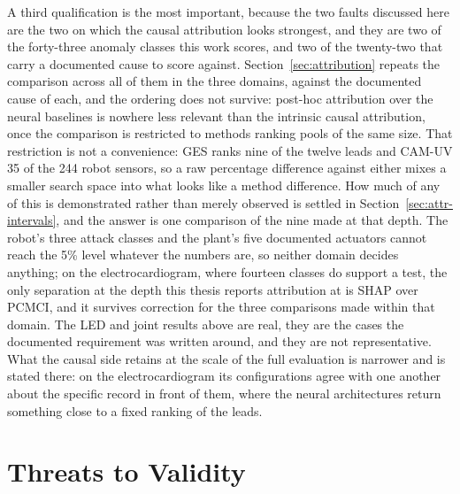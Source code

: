 A third qualification is the most important, because the two faults discussed
here are the two on which the causal attribution looks strongest, and they are
two of the forty-three anomaly classes this work scores, and two of the
twenty-two that carry a documented cause to score against. Section~\ref{sec:attribution}
repeats the comparison across all of them in the three domains, against the
documented cause of each, and the ordering does not survive: post-hoc attribution
over the neural baselines is nowhere less relevant than the intrinsic causal
attribution, once the comparison is restricted to methods ranking pools of the
same size. That restriction is not a convenience: GES ranks nine of the twelve
leads and CAM-UV 35 of the 244 robot sensors, so a raw percentage difference
against either mixes a smaller search space into what looks like a method
difference. How much of any of this is demonstrated rather than merely observed
is settled in Section~\ref{sec:attr-intervals}, and the answer is one comparison
of the nine made at that depth. The robot's three attack classes and the
plant's five documented actuators cannot reach the 5\% level whatever the numbers
are, so neither domain decides anything; on the electrocardiogram, where fourteen
classes do support a test, the only separation at the depth this thesis reports
attribution at is SHAP over PCMCI, and it survives correction for the three
comparisons made within that domain. The LED and joint
results above are real, they are the cases the documented requirement was written
around, and they are not representative. What the causal side retains at the scale
of the full evaluation is narrower and is stated there: on the electrocardiogram
its configurations agree with one another about the specific record in front of
them, where the neural architectures return something close to a fixed ranking of
the leads.

\section{Threats to Validity}
\label{sec:disc-threats}

